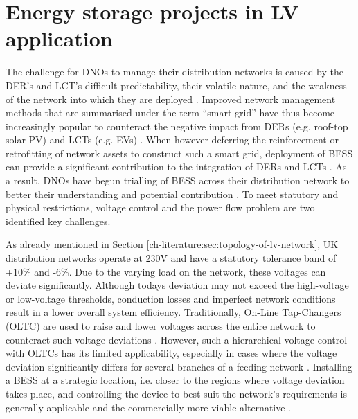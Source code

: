 \section{Energy storage projects in LV application}
\label{ch-literature:sec:energy-storage}

The challenge for DNOs to manage their distribution networks is caused by the DER's and LCT's difficult predictability, their volatile nature, and the weakness of the network into which they are deployed \cite{Woyte2006, Mohd2008a, Koureoumpezis2010, Bravo2015}.
Improved network management methods that are summarised under the term ``smart grid'' have thus become increasingly popular to counteract the negative impact from DERs (e.g. roof-top solar PV) and LCTs (e.g. EVs) \cite{Panteli2015}.
When however deferring the reinforcement or retrofitting of network assets to construct such a smart grid, deployment of BESS can provide a significant contribution to the integration of DERs and LCTs \cite{Grillo2012, Rowe2014a, Li2016, Hosseina2016a}.
As a result, DNOs have begun trialling of BESS across their distribution network to better their understanding and potential contribution \cite{NTVV2016, Lyons2015a, Ferreira2013a}.
To meet statutory and physical restrictions, voltage control and the power flow problem are two identified key challenges.



As already mentioned in Section \ref{ch-literature:sec:topology-of-lv-network}, UK distribution networks operate at 230V and have a statutory tolerance band of +10\% and -6\%.
Due to the varying load on the network, these voltages can deviate significantly.
Although todays deviation may not exceed the high-voltage or low-voltage thresholds, conduction losses and imperfect network conditions result in a lower overall system efficiency.
Traditionally, On-Line Tap-Changers (OLTC) are used to raise and lower voltages across the entire network to counteract such voltage deviations \cite{Sun2009}.
However, such a hierarchical voltage control with OLTCs has its limited applicability, especially in cases where the voltage deviation significantly differs for several branches of a feeding network \cite{Zangs2016}.
Installing a BESS at a strategic location, i.e. closer to the regions where voltage deviation takes place, and controlling the device to best suit the network's requirements is generally applicable and the commercially more viable alternative \cite{Liserre2010}.

